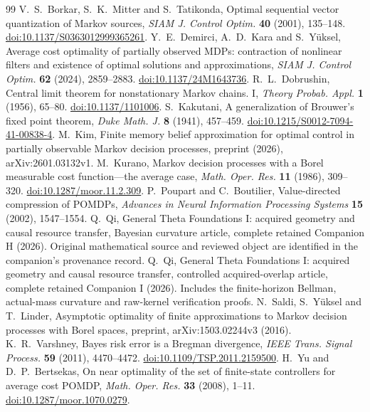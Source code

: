 \begin{thebibliography}{99}
 V.~S.~Borkar, S.~K.~Mitter and S.~Tatikonda, Optimal sequential vector quantization of Markov sources, \emph{SIAM J. Control Optim.} \textbf{40} (2001), 135--148. \href{https://doi.org/10.1137/S0363012999365261}{doi:10.1137/S0363012999365261}.
 Y.~E.~Demirci, A.~D.~Kara and S.~Y\"uksel, Average cost optimality of partially observed MDPs: contraction of nonlinear filters and existence of optimal solutions and approximations, \emph{SIAM J. Control Optim.} \textbf{62} (2024), 2859--2883. \href{https://doi.org/10.1137/24M1643736}{doi:10.1137/24M1643736}.
 R.~L.~Dobrushin, Central limit theorem for nonstationary Markov chains. I, \emph{Theory Probab. Appl.} \textbf{1} (1956), 65--80. \href{https://doi.org/10.1137/1101006}{doi:10.1137/1101006}.
 S.~Kakutani, A generalization of Brouwer's fixed point theorem, \emph{Duke Math. J.} \textbf{8} (1941), 457--459. \href{https://doi.org/10.1215/S0012-7094-41-00838-4}{doi:10.1215/S0012-7094-41-00838-4}.
 M.~Kim, Finite memory belief approximation for optimal control in partially observable Markov decision processes, preprint (2026), arXiv:2601.03132v1.
 M.~Kurano, Markov decision processes with a Borel measurable cost function---the average case, \emph{Math. Oper. Res.} \textbf{11} (1986), 309--320. \href{https://doi.org/10.1287/moor.11.2.309}{doi:10.1287/moor.11.2.309}.
 P.~Poupart and C.~Boutilier, Value-directed compression of POMDPs, \emph{Advances in Neural Information Processing Systems} \textbf{15} (2002), 1547--1554.
 Q.~Qi, General Theta Foundations I: acquired geometry and causal resource transfer, Bayesian curvature article, complete retained Companion H (2026). Original mathematical source and reviewed object are identified in the companion's provenance record.
 Q.~Qi, General Theta Foundations I: acquired geometry and causal resource transfer, controlled acquired-overlap article, complete retained Companion I (2026). Includes the finite-horizon Bellman, actual-mass curvature and raw-kernel verification proofs.
 N.~Saldi, S.~Y\"uksel and T.~Linder, Asymptotic optimality of finite approximations to Markov decision processes with Borel spaces, preprint, arXiv:1503.02244v3 (2016).
 K.~R.~Varshney, Bayes risk error is a Bregman divergence, \emph{IEEE Trans. Signal Process.} \textbf{59} (2011), 4470--4472. \href{https://doi.org/10.1109/TSP.2011.2159500}{doi:10.1109/TSP.2011.2159500}.
 H.~Yu and D.~P.~Bertsekas, On near optimality of the set of finite-state controllers for average cost POMDP, \emph{Math. Oper. Res.} \textbf{33} (2008), 1--11. \href{https://doi.org/10.1287/moor.1070.0279}{doi:10.1287/moor.1070.0279}.
\end{thebibliography}
